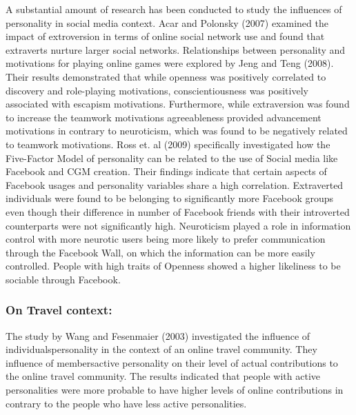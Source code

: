 A substantial amount of research has been conducted to study the influences of personality in social media context. Acar and Polonsky (2007) examined the impact of extroversion in terms of online social network use and found that extraverts nurture larger social networks\cite{acar2007online}. Relationships between personality and motivations for playing online games were explored by Jeng and Teng (2008)\cite{jeng2008personality}. Their results demonstrated that while openness was positively correlated to discovery and role-playing motivations, conscientiousness was positively associated with escapism motivations. Furthermore, while extraversion was found to increase the teamwork motivations agreeableness provided advancement motivations in contrary to neuroticism, which was found to be negatively related to teamwork motivations. Ross et. al (2009) specifically investigated how the Five-Factor Model of personality can be related to the use of Social media like Facebook and CGM creation. Their findings indicate that certain aspects of Facebook usages and personality variables share a high correlation. Extraverted individuals were found to be belonging to significantly more Facebook groups even though their difference in number of Facebook friends with their introverted counterparts were not significantly high. Neuroticism played a role in information control with more neurotic users being more likely to prefer communication through the Facebook Wall, on which the information can be more easily controlled. People with high traits of Openness showed a higher likeliness to be sociable through Facebook\cite{ross2009personality}. 


\subsubsection{On Travel context: }

The study by Wang and Fesenmaier (2003) investigated the influence of individuals\textquotesingle personality in the context of an online travel community. They influence of members\textquotesingle active personality on their level of actual contributions to the online travel community. The results indicated that people with active personalities were more probable to have higher levels of online contributions in contrary to the people who have less active personalities.


